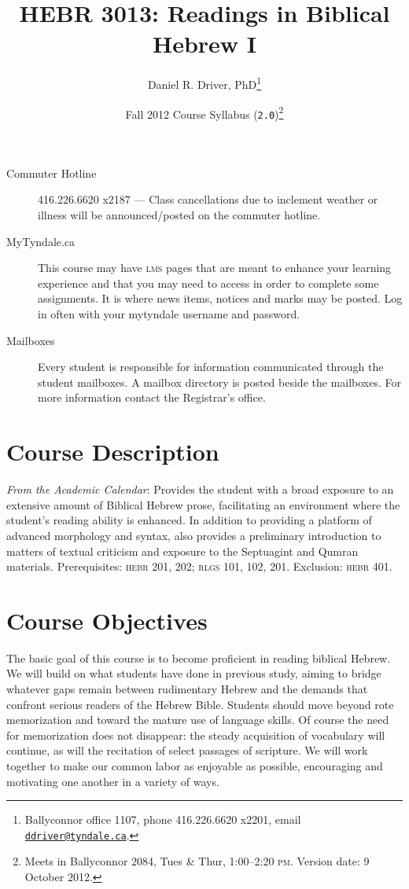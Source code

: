 \documentclass[12pt]{article}
\title{HEBR 3013: Readings in Biblical Hebrew I}
\author{Daniel R. Driver, PhD\thanks{
  Ballyconnor office 1107, phone 416.226.6620 x2201,
  email \href{mailto:ddriver@tyndale.ca}{\texttt{ddriver@tyndale.ca}}.}}
\date{Fall 2012 Course Syllabus (\texttt{2.0})\thanks{Meets in Ballyconnor 2084, Tues \& Thur, 1:00--2:20 \textsc{pm}.
  Version date: 9 October 2012.}}
\begin{document}
\maketitle
\thispagestyle{empty}

\begin{description}
\item[Commuter Hotline]
416.226.6620 x2187 --- Class cancellations due to inclement weather or
illness will be announced/posted on the commuter hotline.
\item[MyTyndale.ca]
This course may have \textsc{lms} pages that are meant to enhance your
learning experience and that you may need to access in order to complete
some assignments. It is where news items, notices and marks may be
posted. Log in often with your mytyndale username and password.
\item[Mailboxes]
Every student is responsible for information communicated through the
student mailboxes. A mailbox directory is posted beside the mailboxes.
For more information contact the Registrar's office.
\end{description}

\section{Course Description}

\emph{From the Academic Calendar}: Provides the student with a broad
exposure to an extensive amount of Biblical Hebrew prose, facilitating
an environment where the student's reading ability is enhanced. In
addition to providing a platform of advanced morphology and syntax, also
provides a preliminary introduction to matters of textual criticism and
exposure to the Septuagint and Qumran materials. Prerequisites:
\textsc{hebr} 201, 202; \textsc{rlgs} 101, 102, 201. Exclusion:
\textsc{hebr} 401.

\section{Course Objectives}

The basic goal of this course is to become proficient in reading
biblical Hebrew. We will build on what students have done in previous
study, aiming to bridge whatever gaps remain between rudimentary Hebrew
and the demands that confront serious readers of the Hebrew Bible.
Students should move beyond rote memorization and toward the mature use
of language skills. Of course the need for memorization does not
disappear: the steady acquisition of vocabulary will continue, as will
the recitation of select passages of scripture. We will work together to
make our common labor as enjoyable as possible, encouraging and
motivating one another in a variety of ways.
\end{document}
